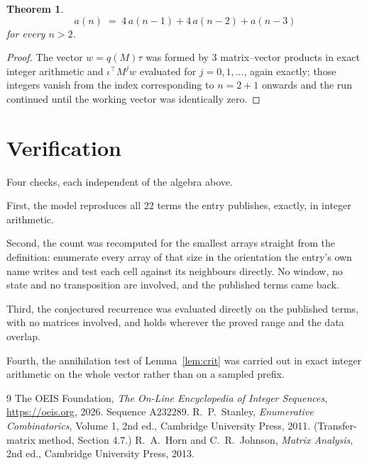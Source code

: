 \documentclass[11pt,a4paper]{article}
\theoremstyle{plain}
\newtheorem{theorem}{Theorem}
\theoremstyle{definition}
\begin{document}
\begin{theorem}
\[
a(n)\;=\;4\,a(n-1) + 4\,a(n-2) + a(n-3)
\]
for every $n>2$.
\end{theorem}

\begin{proof}
The vector $w=q(M)\tau$ was formed by $3$ matrix--vector products in exact integer
arithmetic and $\iota^{\!\top}M^{j}w$ evaluated for $j=0,1,\dots$, again exactly; those
integers vanish from the index corresponding to $n=2+1$ onwards and the run continued
until the working vector was identically zero.
\end{proof}

\section{Verification}

Four checks, each independent of the algebra above.

First, the model reproduces all $22$ terms the entry publishes, exactly, in integer
arithmetic.

Second, the count was recomputed for the smallest arrays straight from the definition:
enumerate every array of that size in the orientation the entry's own name writes and test each
cell against its neighbours directly. No window, no state and no transposition are involved,
and the published terms came back.

Third, the conjectured recurrence was evaluated directly on the published terms, with no
matrices involved, and holds wherever the proved range and the data overlap.

Fourth, the annihilation test of Lemma~\ref{lem:crit} was carried out in exact integer
arithmetic on the whole vector rather than on a sampled prefix.

\begin{thebibliography}{9}
 The OEIS Foundation, \emph{The On-Line Encyclopedia of Integer
Sequences}, \url{https://oeis.org}, 2026. Sequence A232289.
 R.~P.~Stanley, \emph{Enumerative Combinatorics}, Volume 1, 2nd ed.,
Cambridge University Press, 2011. (Transfer-matrix method, Section 4.7.)
 R.~A.~Horn and C.~R.~Johnson, \emph{Matrix Analysis}, 2nd ed., Cambridge
University Press, 2013.
\end{thebibliography}
\end{document}

